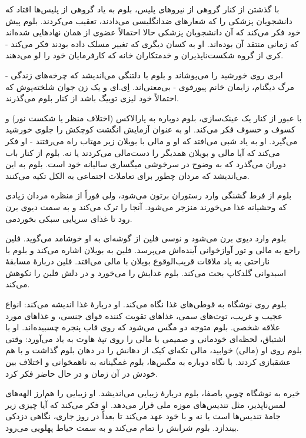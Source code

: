 \documentclass[12pt]{book}
\begin{document}
    با گذشتن از کنار گروهی از نیروهای پلیس، بلوم به یاد گروهی از پلیس‌ها افتاد که دانشجویان پزشکی را که شعارهای ضدانگلیسی می‌دادند، تعقیب می‌کردند. بلوم پیش خود فکر می‌کند که آن دانشجویان پزشکی حالا احتمالاً عضوی از همان نهادهایی شده‌اند که زمانی منتقد آن بوده‌اند. او به کسان دیگری که تغییر مسلک داده بودند فکر می‌کند - کری از گروه شکست‌ناپذیران و خدمتکاران خانه که کارفرمایان خود را لو می‌دهند.

    ابری روی خورشید را می‌پوشاند و بلوم با دلتنگی می‌اندیشد که چرخه‌های زندگی - مرگ دیگنام، زایمان خانم پیورفوی - بی‌معنی‌اند. اِی.ای و یک زن جوان شلخته‌پوش که احتمالاً خود لیزی توییگ باشد از کنار بلوم می‌گذرند.

    با عبور از کنار یک عینک‌سازی، بلوم دوباره به پارالاکس (اختلاف منظر یا شکست نور) و کسوف و خسوف فکر می‌کند. او به عنوان آزمایش انگشت کوچکش را جلوی خورشید می‌گیرد. او به یاد شبی می‌افتد که او و مالی با بویلان زیر مهتاب راه می‌رفتند - او فکر می‌کند که آیا مالی و بویلان همدیگر را دست‌مالی می‌کردند یا نه. بلوم از کنار باب دوران می‌گذرد که به وضوح در سرخوشی میگساری سالیانه خود است. بلوم به این می‌اندیشد که مردان چطور برای تعاملات اجتماعی به الکل تکیه می‌کنند.

    بلوم از فرط گشنگی وارد رستوران برتون می‌شود، ولی فوراً از منظره مردان زیادی که وحشیانه غذا می‌خورند منزجر می‌شود. آنجا را ترک می‌کند و به سمت دیوی برن می‎‌رود تا غذای سرپایی سبکی بخورد.

    بلوم وارد دیوی برن می‌شود و نوسی فلین از گوشه‌ای به او خوشامد می‌گوید. فلین راجع به مالی و تور آوازخوانی آینده‌اش می‌پرسد. فلین به بویلان اشاره می‌کند و بلوم با ناراحتی به یاد ملاقات قریب‌الوقوع بویلان با مالی می‌افتد. فلین دربارۀ مسابقۀ اسبدوانی گلدکاپ بحث می‌کند. بلوم غدایش را می‌خورد و در دلش فلین را نکوهش می‌کند.

    بلوم روی نوشگاه به قوطی‌های غذا نگاه می‌کند. او دربارۀ غذا اندیشه می‌کند: انواع عجیب و غریب، توت‌های سمی، غذاهای تقویت کننده قوای جنسی، و غذاهای مورد علاقه شخصی. بلوم متوجه دو مگس می‌شود که روی قاب پنجره چسبیده‌اند. او با اشتیاق، لحظه‌ای خودمانی و صمیمی با مالی را روی تپۀ هاوث به یاد می‌آورد: وقتی بلوم روی او (مالی) خوابید، مالی تکه‌ای کیک از دهانش را در دهان بلوم گذاشت و با هم عشقبازی کردند. با نگاه دوباره به مگس‌ها، بلوم غمگینانه به ناهمخوانی و اختلاف بین خودش در آن زمان و در حال حاضر فکر کرد.

    خیره به نوشگاه چوبیِ باصفا، بلوم دربارۀ زیبایی می‌اندیشد. او زیبایی را هم‌ارز الهه‌های لمس‌ناپذیر، مثل تندیس‌های موزه ملی قرار می‌دهد. او فکر می‌کند که آیا چیزی زیر جامۀ تندیس‌ها است یا نه و با خود عهد می‌کند تا بعداً در روز جاری، نگاهی دزدکی بیندازد. بلوم شرابش را تمام می‌کند و به سمت حیاط پهلویی می‌رود.
\end{document}
